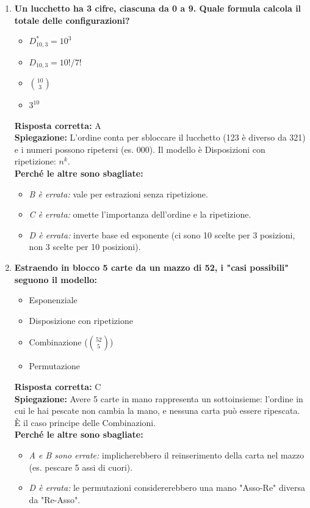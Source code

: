 \documentclass[12pt, a4paper]{article}
\begin{document}
\begin{enumerate}[label=\textbf{\arabic*.}]
    \item \textbf{Un lucchetto ha 3 cifre, ciascuna da 0 a 9. Quale formula calcola il totale delle configurazioni?}
    \begin{itemize}
        \item[A)] $D_{10,3}^* = 10^3$
        \item[B)] $D_{10,3} = 10! / 7!$
        \item[C)] $\binom{10}{3}$
        \item[D)] $3^{10}$
    \end{itemize}
    \textbf{Risposta corretta:} A \\
    \textbf{Spiegazione:} L'ordine conta per sbloccare il lucchetto (123 è diverso da 321) e i numeri possono ripetersi (es. 000). Il modello è Disposizioni con ripetizione: $n^k$. \\
    \textbf{Perché le altre sono sbagliate:}
    \begin{itemize}
        \item \textit{B è errata:} vale per estrazioni senza ripetizione.
        \item \textit{C è errata:} omette l'importanza dell'ordine e la ripetizione.
        \item \textit{D è errata:} inverte base ed esponente (ci sono 10 scelte per 3 posizioni, non 3 scelte per 10 posizioni).
    \end{itemize}

    \item \textbf{Estraendo in blocco 5 carte da un mazzo di 52, i "casi possibili" seguono il modello:}
    \begin{itemize}
        \item[A)] Esponenziale
        \item[B)] Disposizione con ripetizione
        \item[C)] Combinazione ($\binom{52}{5}$)
        \item[D)] Permutazione
    \end{itemize}
    \textbf{Risposta corretta:} C \\
    \textbf{Spiegazione:} Avere 5 carte in mano rappresenta un sottoinsieme: l'ordine in cui le hai pescate non cambia la mano, e nessuna carta può essere ripescata. È il caso principe delle Combinazioni. \\
    \textbf{Perché le altre sono sbagliate:}
    \begin{itemize}
        \item \textit{A e B sono errate:} implicherebbero il reinserimento della carta nel mazzo (es. pescare 5 assi di cuori).
        \item \textit{D è errata:} le permutazioni considererebbero una mano "Asso-Re" diversa da "Re-Asso".
    \end{itemize}
\end{enumerate}
\end{document}
